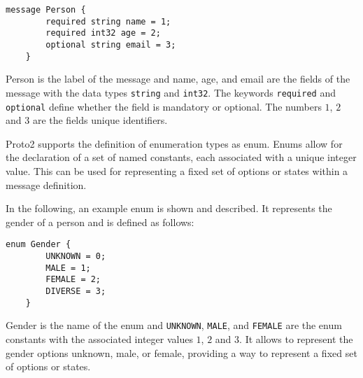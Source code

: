 \documentclass[../MasterThesis.tex]{subfiles}
\begin{document}
\begin{description}[font=\normalfont\color{RedViolet!80!black}, style=nextline]
\begin{lstlisting}[style=protobufStyle, numbers=none]
	message Person {
		required string name = 1;
		required int32 age = 2;
		optional string email = 3;
	}
\end{lstlisting}

Person is the label of the message and name, age, and email are the fields of the message with the data types \texttt{string} and \texttt{int32}.
The keywords \texttt{required} and \texttt{optional} define whether the field is mandatory or optional.
The numbers $1$, $2$ and $3$ are the fields unique identifiers.


\item[Enums] 

Proto2 supports the definition of enumeration types as enum.
Enums allow for the declaration of a set of named constants, each associated with a unique integer value.
This can be used for representing a fixed set of options or states within a message definition.~\cite{protobuffer, proto2_doc}

In the following, an example enum is shown and described. 
It represents the gender of a person and is defined as follows:

\begin{lstlisting}[style=protobufStyle, numbers=none]
	enum Gender {
		UNKNOWN = 0;
		MALE = 1;
		FEMALE = 2;
		DIVERSE = 3;
	}
\end{lstlisting}

Gender is the name of the enum and \texttt{UNKNOWN}, \texttt{MALE}, and \texttt{FEMALE} are the enum constants with the associated integer values $1$, $2$ and $3$.
It allows to represent the gender options unknown, male, or female, providing a way to represent a fixed set of options or states.



\end{description}


	
\end{document}
